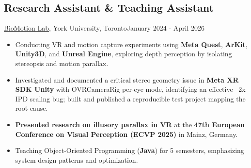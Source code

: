 \subsection{Research Assistant \& Teaching Assistant}{\href{https://www.yorku.ca/research/biomotionlab/}{BioMotion Lab}, York University, Toronto}{January 2024 - April 2026}
\begin{itemize}
    \item Conducting VR and motion capture experiments using \textbf{Meta Quest}, \textbf{ArKit}, \textbf{Unity3D}, and \textbf{Unreal Engine}, exploring depth perception by isolating stereopsis and motion parallax.
    \item Investigated and documented a critical stereo geometry issue in \textbf{Meta XR SDK Unity} with OVRCameraRig per-eye mode, identifying an effective ~2x IPD scaling bug; built and published a reproducible test project mapping the root cause.
    \item \textbf{Presented research on illusory parallax in VR} at the \textbf{47th European Conference on Visual Perception (ECVP 2025)} in Mainz, Germany.
    \item Teaching Object-Oriented Programming (\textbf{Java}) for 5 semesters, emphasizing system design patterns and optimization.
\end{itemize}
